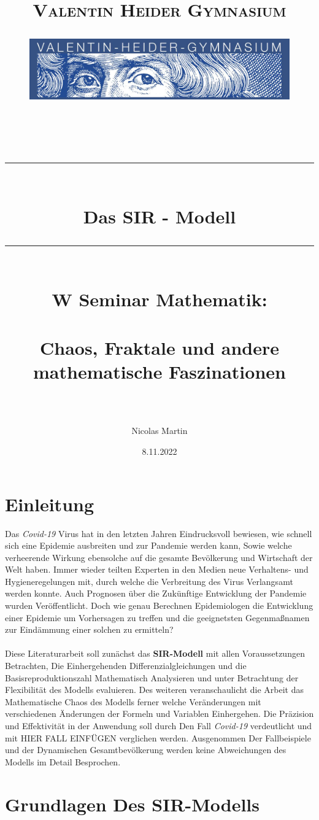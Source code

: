 \documentclass[12pt]{scrartcl} %
\title{	
	\normalfont\normalsize
	\vspace{200pt}
	\textsc{Valentin Heider Gymnasium}\\
	\begin{figure}[h] %
	\centering
	\includegraphics[width=0.5\columnwidth]{VHGLogo.jpg} 
	\end{figure}
	\vspace{25pt}\\
	
	\rule{\linewidth}{0.5pt}\\
	\vspace{20pt}
	{\huge Das SIR - Modell}\\
	\vspace{12pt}
	\rule{\linewidth}{2pt}\\
	\vspace{20pt}
	{\Large W Seminar Mathematik:}\\
	\vspace{12pt}\\
	{\Large Chaos, Fraktale und andere mathematische Faszinationen}\\
	\vspace{15pt}\\
}
\author{\LARGE Nicolas Martin} %
\date{\normalsize 8.11.2022}
\begin{document}
\maketitle %
\thispagestyle{empty}
\newpage

\doublespacing
\tableofcontents
\thispagestyle{empty}
\cleardoublepage
\onehalfspacing
\newpage

\section{Einleitung}

Das \textsl{Covid-19} Virus hat in den letzten Jahren Eindrucksvoll bewiesen, wie schnell sich eine Epidemie ausbreiten und zur Pandemie werden kann,  
Sowie welche verheerende Wirkung ebensolche auf die gesamte Bevölkerung und Wirtschaft der Welt haben. 
Immer wieder teilten Experten in den Medien neue Verhaltens- und Hygieneregelungen mit, durch welche die Verbreitung des Virus Verlangsamt werden konnte. Auch Prognosen über die Zukünftige Entwicklung der Pandemie wurden Veröffentlicht. 
Doch wie genau Berechnen Epidemiologen die Entwicklung einer Epidemie um Vorhersagen zu treffen und die geeignetsten Gegenmaßnamen zur Eindämmung einer solchen zu ermitteln?\\
\\
Diese Literaturarbeit soll zunächst das \textbf{SIR-Modell} mit allen Voraussetzungen Betrachten, Die Einhergehenden Differenzialgleichungen und die Basisreproduktionszahl Mathematisch Analysieren und unter Betrachtung der Flexibilität des Modells evaluieren. 
Des weiteren veranschaulicht die Arbeit das Mathematische Chaos des Modells 
ferner welche Veränderungen mit verschiedenen Änderungen der Formeln und Variablen Einhergehen. 
Die Präzision und Effektivität in der Anwendung soll durch Den Fall \textsl{Covid-19} verdeutlicht und mit  HIER FALL EINFÜGEN verglichen werden. 
Ausgenommen Der Fallbeispiele und der Dynamischen Gesamtbevölkerung werden keine Abweichungen des Modells im Detail Besprochen. 


\newpage
\section{Grundlagen Des SIR-Modells}
\end{document}
